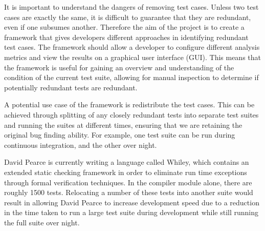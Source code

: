 It is important to understand the dangers of removing test cases. Unless two test cases are exactly the same, it is difficult to guarantee that they are redundant, even if one subsumes another. Therefore the aim of the project is to create a framework that gives developers different approaches in identifying redundant test cases. The framework should allow a developer to configure different analysis metrics and view the results on a graphical user interface (GUI). This means that the framework is useful for gaining an overview and understanding of the condition of the current test suite, allowing for manual inspection to determine if potentially redundant tests are redundant.

A potential use case of the framework is redistribute the test cases. This can be achieved through splitting of any closely redundant tests into separate test suites and running the suites at different times, ensuring that we are retaining the original bug finding ability. For example, one test suite can be run during continuous integration, and the other over night.

David Pearce is currently writing a language called Whiley, which contains an extended static checking framework in order to eliminate run time exceptions through formal verification techniques. In the compiler module alone, there are roughly 1500 tests. Relocating a number of these tests into another suite would result in allowing David Pearce to increase development speed due to a reduction in the time taken to run a large test suite during development while still running the full suite over night. 